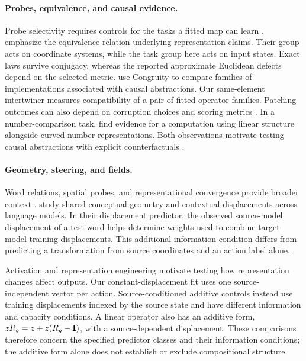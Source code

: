 \paragraph{Probes, equivalence, and causal evidence.}
Probe selectivity requires controls for the tasks a fitted map can learn \citep{hewitt2019designing}. \citet{yao2026groupaction} emphasize the equivalence relation underlying representation claims. Their group acts on coordinate systems, while the task group here acts on input states. Exact laws survive conjugacy, whereas the reported approximate Euclidean defects depend on the selected metric. \citet{sun2026tracking} use Congruity to compare families of implementations associated with causal abstractions. Our same-element intertwiner measures compatibility of a pair of fitted operator families. Patching outcomes can also depend on corruption choices and scoring metrics \citep{zhang2024patching}. In a number-comparison task, \citet{hindupur2026comparison} find evidence for a computation using linear structure alongside curved number representations. Both observations motivate testing causal abstractions with explicit counterfactuals \citep{geiger2022inducing,geiger2025causal}.

\paragraph{Geometry, steering, and fields.}
Word relations, spatial probes, and representational convergence provide broader context \citep{mikolov2013linguistic,bolukbasi2016man,gurnee2023language,huh2024platonic}. \citet{hu2026language} study shared conceptual geometry and contextual displacements across language models. In their displacement predictor, the observed source-model displacement of a test word helps determine weights used to combine target-model training displacements. This additional information condition differs from predicting a transformation from source coordinates and an action label alone.

Activation and representation engineering \citep{turner2023activation,zou2023representation} motivate testing how representation changes affect outputs. Our constant-displacement fit uses one source-independent vector per action. Source-conditioned additive controls instead use training displacements indexed by the source state and have different information and capacity conditions. A linear operator also has an additive form, $zR_g=z+z(R_g-\mathbf{I})$, with a source-dependent displacement. These comparisons therefore concern the specified predictor classes and their information conditions; the additive form alone does not establish or exclude compositional structure.
